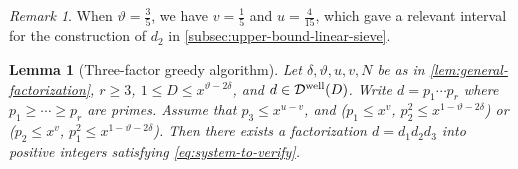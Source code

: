 \documentclass[reqno,11pt]{amsart}
\newtheorem{lemma}[theorem]{Lemma}
\theoremstyle{remark}
\newtheorem*{remark}{Remark}
\numberwithin{equation}{section}
\newcommand{\mDw}{\mathcal{D}^{\textnormal{well}}}
\begin{document}
\begin{remark}
When $\vartheta = \tfrac{3}{5}$, we have $v = \tfrac{1}{5}$ and $u = \tfrac{4}{15}$, which gave a relevant interval for the construction of $d_2$ in \cref{subsec:upper-bound-linear-sieve}.
\end{remark}



\begin{lemma}[Three-factor greedy algorithm] \label{lem:greedy-algorithm}
Let $\delta, \vartheta, u, v, N$ be as in \cref{lem:general-factorization}, $r \ge 3$, $1 \le D \le x^{\vartheta-2\delta}$, and $d \in \mDw(D)$. Write $d = p_1\cdots p_r$ where $p_1 \ge \cdots \ge p_r$ are primes. Assume that $p_3 \le x^{u-v}$, and ($p_1 \le x^v$, $p_2^2 \le x^{1-\vartheta-2\delta}$) or ($p_2 \le x^v$, $p_1^2 \le x^{1-\vartheta-2\delta}$). Then there exists a factorization $d = d_1d_2d_3$ into positive integers satisfying \cref{eq:system-to-verify}.
\end{lemma}
\end{document}
